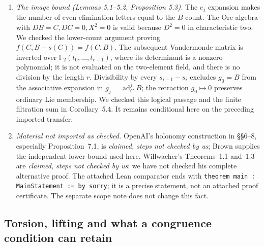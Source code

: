 \begin{enumerate}[leftmargin=*]
two.  We checked the logarithmic triangle/residue argument for the
incidence relations, including repeated letters.  Independently,
\nolinkurl{graded_preprint_audit.py} finds the thirteen codimension-two
flats of the $B_3$ arrangement and verifies 13,104 exact integral
deletion incidence relations on all words of lengths zero through
five.  We followed the minimal-$A$ argument: an $e$ before a nonempty
$p,0$ block cannot be deleted before that block, and its final $p$ or
$0$ has coefficient zero modulo two.  Reversal excludes the remaining
terminal-$e$ words.  In Proposition~4.4 the two-marked-position test
forces all $A,B$ coefficients to agree, and the three-marked-position
test kills their common value when there are at least two $A$'s.
We checked separately the one-$A$ exceptions $r=1,2$.
These observations check the stated argument conditional on the
transferred relation; bounded deletion tests alone are not an
all-weight proof.
\item \emph{The image bound (Lemmas 5.1--5.2, Proposition 5.3).}
The $e_j$ expansion makes the number of even elimination letters equal
to the $B$-count.  The Ore algebra with $DB=C,DC=0,X^2=0$ is valid
because $D^2=0$ in characteristic two.  We checked the lower-count
argument proving $f(C,B+s(C))=f(C,B)$.
The subsequent Vandermonde matrix is inverted over
$\mathbb F_2(t_0,\ldots,t_{r-1})$, where its determinant is a nonzero
polynomial; it is not evaluated on the two-element field, and there
is no division by the length $r$.  Divisibility by every
$s_{i-1}-s_i$ excludes $g_0=B$ from the associative expansion in
$g_j=\operatorname{ad}_C^jB$; the retraction $g_0\mapsto0$ preserves
ordinary Lie membership.  We checked this logical passage and the
finite filtration sum in Corollary~5.4.  It remains conditional here
on the preceding imported transfer.
\item \emph{Material not imported as checked.}  OpenAI's holonomy
construction in \S\S6--8, especially Proposition~7.1, is
\emph{claimed, steps not checked by us}; Brown supplies the independent
lower bound used here.  Willwacher's Theorems~1.1 and~1.3 are
\emph{claimed, steps not checked by us}: we have not checked his
complete alternative proof.  The attached Lean comparator ends with
\texttt{theorem main : MainStatement := by sorry}; it is a precise
statement, not an attached proof certificate.  The separate scope
note does not change this fact.
\end{enumerate}

\subsection{Torsion, lifting and what a congruence condition can retain}

